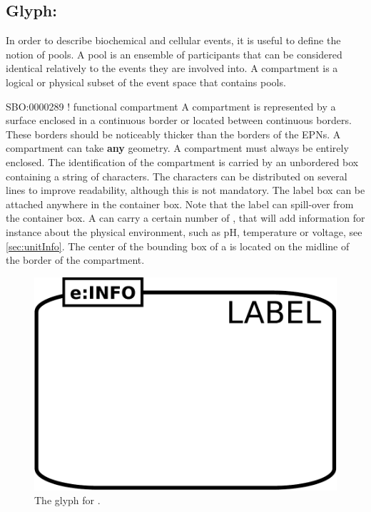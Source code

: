 \subsection{Glyph: }\label{sec:compartment}

In order to describe biochemical and cellular events, it is useful to
define the notion of pools. A pool is an ensemble of participants that
can be considered identical relatively to the events they are involved
into. A compartment is a logical or physical subset of the event space
that contains pools.

\begin{glyphDescription}
\glyphSboTerm  SBO:0000289 ! functional compartment 
\glyphContainer A compartment is represented by a surface
  enclosed in a continuous border or located between continuous borders. These borders should be noticeably thicker than the borders of the EPNs. A compartment can take \textbf{any} geometry. A compartment must always be entirely enclosed.
\glyphLabel The identification of the compartment is
  carried by an unbordered box containing a string of characters. The
  characters can be distributed on several lines to improve
  readability, although this is not mandatory. The label box can be
  attached anywhere in the container box. Note that the label can
  spill-over from the container box.
\glyphAux A  can carry a
  certain number of , that will add
  information for instance about the physical environment, such as pH,
  temperature or voltage, see \ref{sec:unitInfo}.
  The center of the bounding box of a  is
  located on the midline of the border of the compartment. 
\end{glyphDescription}

\begin{figure}[H]
  \centering
  \includegraphics[scale = 0.3]{images/compartment}
  \caption{The \PD glyph for .}
  \label{fig:compartment}
\end{figure}


